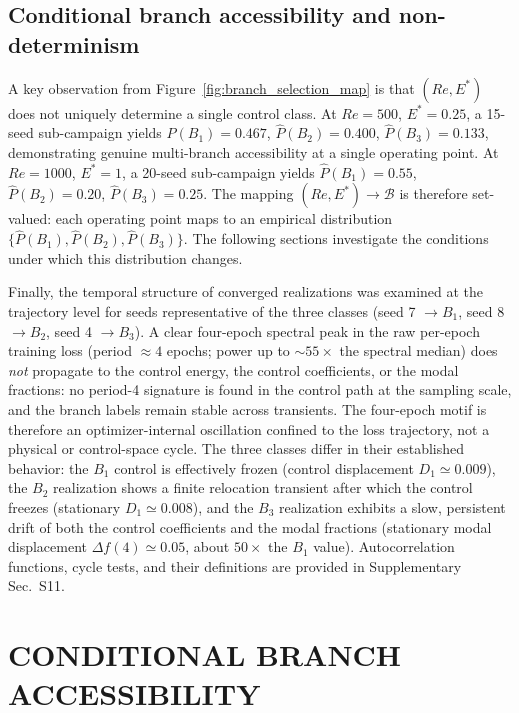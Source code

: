 \documentclass[a4paper,11pt]{article}
\begin{document}
\subsection{Conditional branch accessibility and non-determinism}

A key observation from Figure~\ref{fig:branch_selection_map} is that \((Re,E^*)\)
does not uniquely determine a single control class. At \(Re=500\), \(E^*=0.25\),
a 15-seed sub-campaign yields \(\widehat P(B_1)=0.467\), \(\widehat P(B_2)=0.400\),
\(\widehat P(B_3)=0.133\), demonstrating genuine multi-branch accessibility at a
single operating point. At \(Re=1000\), \(E^*=1\), a 20-seed sub-campaign yields
\(\widehat P(B_1)=0.55\), \(\widehat P(B_2)=0.20\), \(\widehat P(B_3)=0.25\).
The mapping \((Re,E^*)\to\mathcal{B}\) is therefore set-valued: each operating
point maps to an empirical distribution \(\{\widehat P(B_1),\widehat P(B_2),
\widehat P(B_3)\}\). The following sections investigate the conditions under
which this distribution changes.

Finally, the temporal structure of converged realizations was examined at the
trajectory level for seeds representative of the three classes (seed 7
\(\to B_1\), seed 8 \(\to B_2\), seed 4 \(\to B_3\)). A clear four-epoch
spectral peak in the raw per-epoch training loss (period \(\approx4\) epochs;
power up to \(\sim55\times\) the spectral median) does \emph{not} propagate to
the control energy, the control coefficients, or the modal fractions: no
period-4 signature is found in the control path at the sampling scale, and the
branch labels remain stable across transients. The four-epoch motif is therefore
an optimizer-internal oscillation confined to the loss trajectory, not a physical
or control-space cycle. The three classes differ in their established behavior:
the \(B_1\) control is effectively frozen (control displacement
\(D_1\simeq0.009\)), the \(B_2\) realization shows a finite relocation transient
after which the control freezes (stationary \(D_1\simeq0.008\)), and the \(B_3\)
realization exhibits a slow, persistent drift of both the control coefficients and
the modal fractions (stationary modal displacement \(\Delta f(4)\simeq0.05\),
about \(50\times\) the \(B_1\) value). Autocorrelation functions, cycle tests,
and their definitions are provided in Supplementary Sec.~S11.

\section{CONDITIONAL BRANCH ACCESSIBILITY}
\label{sec:accessibility}
\end{document}
